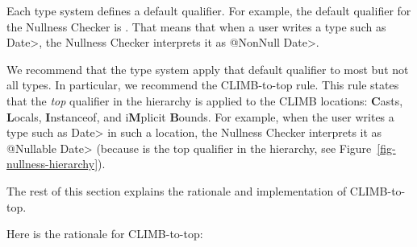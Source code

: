 Each type system defines a default qualifier.  For example, the default
qualifier for the Nullness Checker is
.  That means that when a user
writes a type such as \<Date>, the Nullness Checker interprets it as 
\<@NonNull Date>.

We recommend that the type system apply that default qualifier to most but
not all types.  In particular, we recommend the CLIMB-to-top rule.  This
rule states that the \emph{top} qualifier in the hierarchy is applied to
the CLIMB locations:  \textbf{C}asts, \textbf{L}ocals, \textbf{I}nstanceof, and i\textbf{M}plicit \textbf{B}ounds.
For example, when the user writes a type such as \<Date> in such a
location, the Nullness Checker interprets it as \<@Nullable Date> (because
 is the top qualifier in the
hierarchy, see Figure~\ref{fig-nullness-hierarchy}).



The rest of this section explains the rationale and implementation of
CLIMB-to-top.

Here is the rationale for CLIMB-to-top:

